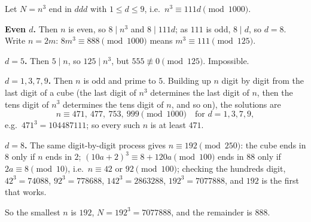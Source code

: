 Let $N=n^3$ end in $ddd$ with $1\le d\le9$, i.e.\ $n^3\equiv111d\pmod{1000}$.

\textbf{Even $d$.} Then $n$ is even, so $8\mid n^3$ and $8\mid111d$; as $111$ is odd, $8\mid d$, so $d=8$. Write $n=2m$: $8m^3\equiv888\pmod{1000}$ means $m^3\equiv111\pmod{125}$.

\textbf{$d=5$.} Then $5\mid n$, so $125\mid n^3$, but $555\not\equiv0\pmod{125}$. Impossible.

\textbf{$d=1,3,7,9$.} Then $n$ is odd and prime to $5$. Building up $n$ digit by digit from the last digit of a cube (the last digit of $n^3$ determines the last digit of $n$, then the tens digit of $n^3$ determines the tens digit of $n$, and so on), the solutions are
\[
n\equiv471,\ 477,\ 753,\ 999\pmod{1000}\quad\text{for }d=1,3,7,9,
\]
e.g.\ $471^3=104487111$; so every such $n$ is at least $471$.

\textbf{$d=8$.} The same digit-by-digit process gives $n\equiv192\pmod{250}$: the cube ends in $8$ only if $n$ ends in $2$; $(10a+2)^3\equiv8+120a\pmod{100}$ ends in $88$ only if $2a\equiv8\pmod{10}$, i.e.\ $n\equiv42$ or $92\pmod{100}$; checking the hundreds digit, $42^3=74088$, $92^3=778688$, $142^3=2863288$, $192^3=7077888$, and $192$ is the first that works.

So the smallest $n$ is $192$, $N=192^3=7077888$, and the remainder is $\boxed{888}$.
